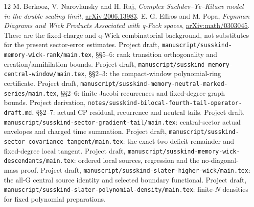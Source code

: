 \documentclass[11pt]{article}
\begin{document}
\newpage
\begin{thebibliography}{12}\small
{} M. Berkooz, V. Narovlansky and H. Raj,
\emph{Complex Sachdev--Ye--Kitaev model in the double scaling limit},
\href{https://arxiv.org/abs/2006.13983}{arXiv:2006.13983}.
 E. G. Effros and M. Popa,
\emph{Feynman Diagrams and Wick Products Associated with q-Fock spaces},
\href{https://arxiv.org/abs/math/0303045}{arXiv:math/0303045}.
These are the fixed-charge and q-Wick combinatorial background,
not substitutes for the present sector-error estimates.
 Project draft,
\nolinkurl{manuscript/susskind-memory-wick-rank/main.tex}, §§5--6:
rank transition orthogonality and creation/annihilation bounds.
 Project draft,
\nolinkurl{manuscript/susskind-memory-central-window/main.tex}, §§2--3:
the compact-window polynomial-ring certificate.
 Project draft,
\nolinkurl{manuscript/susskind-memory-neutral-marked-series/main.tex},
§§2--6: finite Jacobi recurrences and fixed-degree graph bounds.
 Project derivation,
\nolinkurl{notes/susskind-bilocal-fourth-tail-operator-draft.md},
§§2--7: actual CP residual, recurrence and neutral tails.
 Project draft,
\nolinkurl{manuscript/susskind-sector-gradient-tail/main.tex}:
central-sector actual envelopes and charged time summation.
 Project draft,
\nolinkurl{manuscript/susskind-sector-covariance-tangent/main.tex}:
the exact two-deficit remainder and fixed-degree local tangent.
 Project draft,
\nolinkurl{manuscript/susskind-memory-wick-descendants/main.tex}:
ordered local sources, regression and the no-diagonal-mass proof.
 Project draft,
\nolinkurl{manuscript/susskind-slater-higher-wick/main.tex}:
the all-G central source identity and selected boundary functional.
 Project draft,
\nolinkurl{manuscript/susskind-slater-polynomial-density/main.tex}:
finite-$N$ densities for fixed polynomial preparations.
\end{thebibliography}
\end{document}
